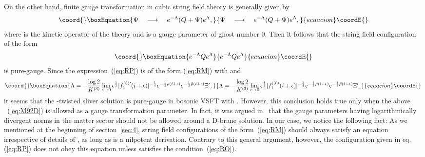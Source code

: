 \documentclass[a4paper,12pt]{article}
\providecommand{\cQ}{\mathcal{Q}}
\providecommand{\Qmid}{\cQ_{\mathrm{GRSZ}}}
\begin{document}
On the other hand, finite gauge transformation in 
cubic string field theory is generally given by 
\begin{equation}\coord{}\boxEquation{
\Psi \quad \longrightarrow \quad e^{-\Lambda}(Q+\Psi)e^{\Lambda}, \label{eq:RL}
}{
\Psi \quad \longrightarrow \quad e^{-\Lambda}(Q+\Psi)e^{\Lambda}, }{ecuacion}\coordE{}\end{equation}
where \coordHE{} is the kinetic operator of the theory and \myHighlight{$\Lambda$}\coordHE{} is a gauge parameter of ghost number 0. 
Then it follows that the string field configuration of the form 
\begin{equation}\coord{}\boxEquation{
e^{-\Lambda}Qe^{\Lambda} \label{eq:RM}
}{
e^{-\Lambda}Qe^{\Lambda} }{ecuacion}\coordE{}\end{equation}
is pure-gauge. 
Since the expression~(\ref{eq:RP}) 
is of the form (\ref{eq:RM}) with \myHighlight{$Q=\Qmid$}\coordHE{} and 
\begin{equation}\coord{}\boxEquation{
\Lambda=-\frac{\log 2}{K^{(3)}}
\lim_{\epsilon\to 0}\epsilon^{\frac{1}{2}}|f^{(3)\prime}_1(i+\epsilon)|^{-\frac{1}{4}}e^{-\frac{1}{2}
\rho(i+\epsilon)}e^{-\frac{1}{2}\bar{\rho}(i+\epsilon)}\Xi^{\prime}, \label{eq:M92D}
}{
\Lambda=-\frac{\log 2}{K^{(3)}}
\lim_{\epsilon\to 0}\epsilon^{\frac{1}{2}}|f^{(3)\prime}_1(i+\epsilon)|^{-\frac{1}{4}}e^{-\frac{1}{2}
\rho(i+\epsilon)}e^{-\frac{1}{2}\bar{\rho}(i+\epsilon)}\Xi^{\prime}, }{ecuacion}\coordE{}\end{equation}
it seems that the \coordHE{}-twisted sliver solution \coordHE{} is pure-gauge in bosonic VSFT with 
\myHighlight{$\cQ=\Qmid$}\coordHE{}. However, this conclusion holds true only when the above \myHighlight{$\Lambda$}\coordHE{}~(\ref{eq:M92D}) 
is allowed as a 
gauge transformation parameter. In fact, it was argued in~\cite{RSZ4} that 
the gauge parameters having logarithmically divergent norms in the matter sector should 
not be allowed around a D-brane solution. In our case, we notice the following fact: 
As we mentioned at the beginning of section~\ref{sec:4}, string field configurations \myHighlight{$\psi$}\coordHE{} of the 
form~(\ref{eq:RM}) should always satisfy an equation \coordHE{} irrespective of 
details of \myHighlight{$\Lambda$}\coordHE{}, as long as \coordHE{} is a nilpotent derivation. Contrary to this general argument, 
however, the configuration given in eq.(\ref{eq:RP}) does not obey this equation unless \coordHE{} 
satisfies the condition~(\ref{eq:RO}). 
\end{document}
